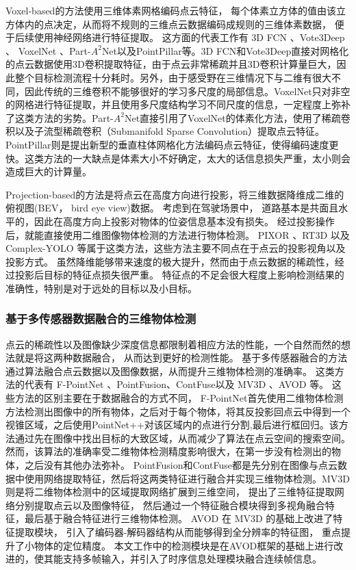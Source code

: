 Voxel-based的方法使用三维体素网格编码点云特征， 每个体素立方体的值由该立方体内的点决定，从而将不规则的三维点云数据编码成规则的三维体素数据， 便于后续使用神经网络进行特征提取。 这方面的代表工作有 3D FCN \cite{li20173d}、Vote3Deep \cite{engelcke2017vote3deep}、 VoxelNet \cite{zhou2018voxelnet}、Part-$A^2$Net\cite{shi2020part}以及PointPillar\cite{lang2018pointpillars}等。3D FCN和Vote3Deep直接对网格化的点云数据使用3D卷积提取特征，由于点云非常稀疏并且3D卷积计算量巨大，因此整个目标检测流程十分耗时。另外，由于感受野在三维情况下与二维有很大不同，因此传统的三维卷积不能够很好的学习多尺度的局部信息。VoxelNet只对非空的网格进行特征提取，并且使用多尺度结构学习不同尺度的信息，一定程度上弥补了这类方法的劣势。Part-$A^2$Net直接引用了VoxelNet的体素化方法，使用了稀疏卷积以及子流型稀疏卷积（Submanifold Sparse Convolution\cite{Graham3D}）提取点云特征。PointPillar则是提出新型的垂直柱体网格化方法编码点云特征，使得编码速度更快。这类方法的一大缺点是体素大小不好确定，太大的话信息损失严重，太小则会造成巨大的计算量。 

Projection-based的方法是将点云在高度方向进行投影，将三维数据降维成二维的俯视图(BEV， bird eye view)数据。 考虑到在驾驶场景中， 道路基本是共面且水平的，因此在高度方向上投影对物体的位姿信息基本没有损失。 经过投影操作后，就能直接使用二维图像物体检测的方法进行物体检测。 PIXOR \cite{yang2018pixor}、RT3D\cite{8403277} 以及 Complex-YOLO \cite{simon2018complex,Simon_2019_CVPR_Workshops} 等属于这类方法，这些方法主要不同点在于点云的投影视角以及投影方式。 虽然降维能够带来速度的极大提升，然而由于点云数据的稀疏性，经过投影后目标的特征点损失很严重。 特征点的不足会很大程度上影响检测结果的准确性，特别是对于远处的目标以及小目标。

\subsubsection{基于多传感器数据融合的三维物体检测}

点云的稀疏性以及图像缺少深度信息都限制着相应方法的性能，一个自然而然的想法就是将这两种数据融合， 从而达到更好的检测性能。 基于多传感器融合的方法通过算法融合点云数据以及图像数据，从而提升三维物体检测的准确率。 这类方法的代表有 F-PointNet \cite{qi2018frustum}、PointFusion\cite{XuPointFusion}、ContFuse\cite{Ming2018Deep}以及 MV3D \cite{chen2017multi}、AVOD \cite{ku2018joint}等。 这些方法的区别主要在于数据融合的方式不同， F-PointNet首先使用二维物体检测方法检测出图像中的所有物体，之后对于每个物体，将其反投影回点云中得到一个视锥区域，之后使用PointNet++\cite{qi2017pointnet++}对该区域内的点进行分割,最后进行框回归。该方法通过先在图像中找出目标的大致区域，从而减少了算法在点云空间的搜索空间。然而，该算法的准确率受二维物体检测精度影响很大，在第一步没有检测出的物体，之后没有其他办法弥补。 PointFusion和ContFuse都是先分别在图像与点云数据中使用网络提取特征，然后将这两类特征进行融合并实现三维物体检测。MV3D 则是将二维物体检测中的区域提取网络扩展到三维空间， 提出了三维特征提取网络分别提取点云以及图像特征， 然后通过一个特征融合模块得到多视角融合特征，最后基于融合特征进行三维物体检测。 AVOD 在 MV3D 的基础上改进了特征提取模块， 引入了编码器-解码器结构从而能够得到全分辨率的特征图， 重点提升了小物体的定位精度。 本文工作中的检测模块是在AVOD框架的基础上进行改进的，使其能支持多帧输入，并引入了时序信息处理模块融合连续帧信息。

